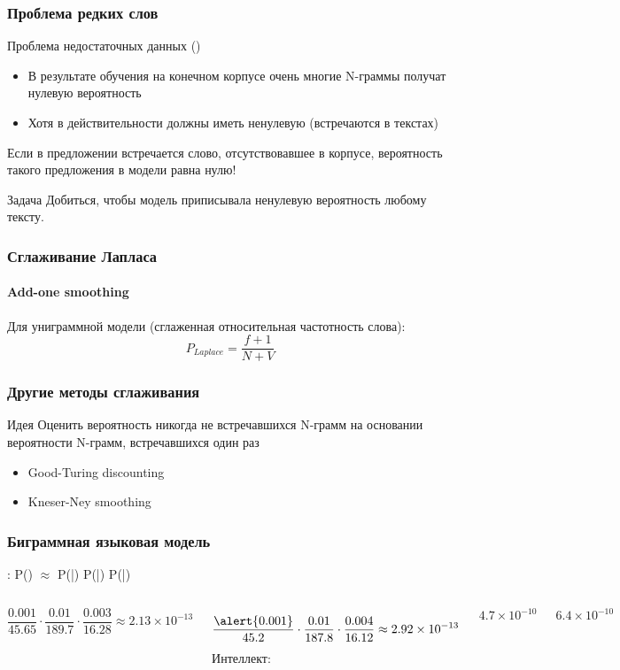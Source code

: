 \documentclass[10pt,svgnames]{beamer}
\begin{document}
\begin{frame}
  \frametitle{Проблема редких слов}
  Проблема недостаточных данных ()
  \begin{itemize}
  \item В результате обучения на конечном корпусе очень многие
    N-граммы получат нулевую вероятность
  \item Хотя в действительности должны иметь ненулевую (встречаются в
    текстах)
  \end{itemize}
  Если в предложении встречается слово, отсутствовавшее в корпусе,
  вероятность такого предложения в модели \alert{равна нулю}!

  \begin{block}{Задача}
    Добиться, чтобы модель приписывала ненулевую вероятность любому тексту.
  \end{block}
\end{frame}

\begin{frame}
  \frametitle{Сглаживание Лапласа}
  \framesubtitle{Add-one smoothing}
  
  Для униграммной модели (сглаженная относительная частотность слова):
\begin{equation}
    P_{Laplace}=\frac{f + 1}{N + V}
  \end{equation}  
\end{frame}

\begin{frame}
  \frametitle{Другие методы сглаживания}
  \begin{block}{Идея}
    Оценить вероятность никогда не встречавшихся N-грамм на основании
    вероятности N-грамм, встречавшихся один раз
  \end{block}
  \begin{itemize}
  \item Good-Turing discounting
  \item Kneser-Ney smoothing
  \end{itemize}
\end{frame}

\begin{frame}
  \frametitle{Биграммная языковая модель}
  :
  P() $\approx$
  P(|) 
  P(|)
  P(|)

  \begin{columns}
    $$
    \frac{0.001}{45.65} \cdot
    \frac{0.01}{189.7} \cdot \frac{0.003}{16.28} \approx 2.13 \times
    10^{-13}
  $$

  $$
  \frac{\alert{0.001}}{45.2} \cdot \frac{0.01}{187.8} \cdot
  \frac{0.004}{16.12} \approx 2.92 \times 10^{-13}
  $$
  \alert{Интеллект}:
  
  $$
  4.7 \times 10^{-10}$$
  
  $$6.4 \times 10^{-10}$$
\end{columns}
\end{frame}
\end{document}
